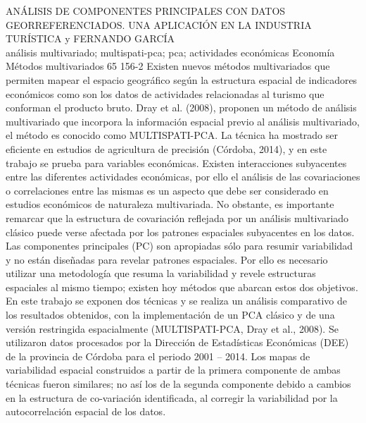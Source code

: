 \A
{ANÁLISIS DE COMPONENTES PRINCIPALES CON DATOS GEORREFERENCIADOS. UNA APLICACIÓN EN LA INDUSTRIA TURÍSTICA}
{ y FERNANDO GARCÍA}
{
\\}
{análisis multivariado; multispati-pca; pca; actividades económicas} 
 {Economía} 
 {Métodos multivariados} 
 {65} 
 {156-2}
{Existen nuevos métodos multivariados que permiten mapear el espacio geográfico según la estructura espacial de indicadores económicos como son los datos de actividades relacionadas al turismo que conforman el producto bruto. Dray et al. (2008), proponen un método de análisis multivariado que incorpora la información espacial previo al análisis multivariado, el método es conocido como MULTISPATI-PCA. La técnica ha mostrado ser eficiente en estudios de agricultura de precisión (Córdoba, 2014), y en este trabajo se prueba para variables económicas. Existen interacciones subyacentes entre las diferentes actividades económicas, por ello el análisis de las covariaciones o correlaciones entre las mismas es un aspecto que debe ser considerado en estudios económicos de naturaleza multivariada. No obstante, es importante remarcar que la estructura de covariación reflejada por un análisis multivariado clásico puede verse afectada por los patrones espaciales subyacentes en los datos. Las componentes principales (PC) son apropiadas sólo para resumir variabilidad y no están diseñadas para revelar patrones espaciales. Por ello es necesario utilizar una metodología que resuma la variabilidad y revele estructuras espaciales al mismo tiempo; existen hoy métodos que abarcan estos dos objetivos. En este trabajo se exponen dos técnicas y se realiza un análisis comparativo de los resultados obtenidos, con la implementación de un PCA clásico y de una versión restringida espacialmente (MULTISPATI-PCA, Dray et al., 2008). Se utilizaron datos procesados por la Dirección de Estadísticas Económicas (DEE) de la provincia de Córdoba para el periodo 2001 – 2014. Los mapas de variabilidad espacial construidos a partir de la primera componente de ambas técnicas fueron similares; no así los de la segunda componente debido a cambios en la estructura de co-variación identificada, al corregir la variabilidad por la autocorrelación espacial de los datos.}
